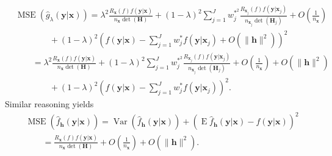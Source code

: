 \documentclass[11pt]{article}
\newcommand{\Hbf}{\textbf{H}}
\newcommand{\y}{\textbf{y}}
\newcommand{\x}{\textbf{x}}
\newcommand{\h}{\textbf{h}}
\newcommand{\wstar}{w^{\textstyle{*}}}
\newcommand{\wstarsq}{w^{\textstyle{*}^2}}
\DeclareMathOperator{\E}{E}
\DeclareMathOperator{\Var}{Var}
\DeclareMathOperator{\MSE}{MSE}
\begin{document}
\begin{align*}
  &\MSE(\hat g_\lambda(\y|\x)) = \lambda^2 \frac{R_{\x}(f)f(\y|\x)}{n_\x\det(\Hbf)} 
    + (1 - \lambda)^2\sum_{j=1}^J\wstarsq_j\frac{R_{\x_j}(f)f(\y|\x_j)}{n_{\x_j}\det(\Hbf_j)}
    + O\left(\frac{1}{n_\x}\right) \\
    &\qquad\qquad+ (1-\lambda)^2\left(f(\y|\x) - \sum_{j=1}^J\wstar_jf(\y|\x_j) 
    + O(\|\h\|^2)\right)^2 \\
  &\qquad=  \lambda^2 \frac{R_{\x}(f)f(\y|\x)}{n_\x\det(\Hbf)} 
    + (1 - \lambda)^2\sum_{j=1}^J\wstarsq_j\frac{R_{\x_j}(f)f(\y|\x_j)}{n_{\x_j}\det(\Hbf_j)}
    + O\left(\frac{1}{n_\x}\right) + O(\|\h\|^2) \\
    &\qquad\qquad+ (1-\lambda)^2\left(f(\y|\x) - \sum_{j=1}^J\wstar_jf(\y|\x_j)\right)^2.
\end{align*}
Similar reasoning yields
\begin{align*}
  &\MSE(\hat f_\h(\y|\x)) = \Var\left(\hat f_\h(\y|\x)\right) 
    + \left(\E\hat f_\h(\y|\x) - f(\y|\x)\right)^2 \\
  &\qquad= \frac{R_{\x}(f)f(\y|\x)}{n_\x\det(\Hbf)} + O\left(\frac{1}{n_\x}\right) + O(\|\h\|^2).
\end{align*}
\end{document}

